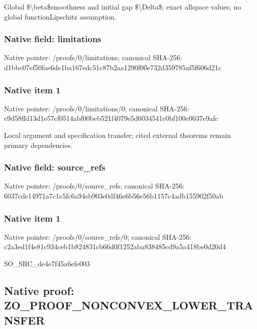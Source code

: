 \documentclass[10pt,a4paper]{article}
\begin{document}
Global \$\textbackslash{}beta\$smoothness and initial gap \$\textbackslash{}Delta\$; exact allspace values; no global functionLipschitz assumption.


\subsubsection{Native field: limitations}


Native pointer: /proofs/0/limitations; canonical SHA-256: d1bbc07ef50fae6de1ba167e\allowbreak{}dc51c87b2aa1290f00e732d3\allowbreak{}59785af5f606d21c



\subsubsection{Native item 1}


Native pointer: /proofs/0/limitations/0; canonical SHA-256: e9d58ffd13d1e57cf0514abf\allowbreak{}00beb521f4079e5d6034541c\allowbreak{}0bf100c0037e9afc


Local argument and specification transfer; cited external theorems remain primary dependencies.


\subsubsection{Native field: source\_refs}


Native pointer: /proofs/0/source\_refs; canonical SHA-256: 6037cde14971a7c1c5fc6a94\allowbreak{}eb903e0df46e6b56e56b1157\allowbreak{}c4adb155902f50ab



\subsubsection{Native item 1}


Native pointer: /proofs/0/source\_refs/0; canonical SHA-256: c2a3ed1f4e81c934ceb1b824\allowbreak{}831cb66d0f1252aba838485c\allowbreak{}d9a5a418be0d20d4


SO\_SRC\_de4e7f45a6efe003


\subsection{Native proof: ZO\_PROOF\_NONCONVEX\_LOWER\_TRANSFER}
\end{document}
